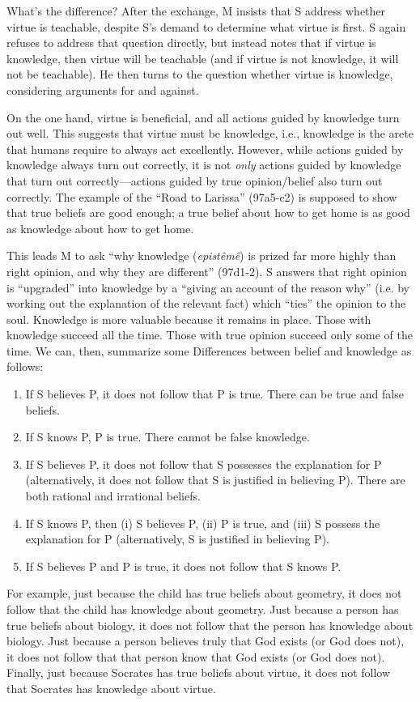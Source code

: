 \documentclass[10 pt]{article}
\begin{document}
What's the difference? After the exchange, M insists that S address whether virtue is teachable, despite S's demand to determine what virtue is first. S again refuses to address that question directly, but instead notes that if virtue is knowledge, then virtue will be teachable (and if virtue is not knowledge, it will not be teachable). He then turns to the question whether virtue is knowledge, considering arguments for and against. 

On the one hand, virtue is beneficial, and all actions guided by knowledge turn out well. This suggests that virtue must be knowledge, i.e., knowledge is the arete that humans require to always act excellently. However, while actions guided by knowledge always turn out correctly, it is not \emph{only} actions guided by knowledge that turn out correctly---actions guided by true opinion/belief also turn out correctly.  The example of the ``Road to Larissa'' (97a5-c2) is supposed to show that true beliefs are good enough; a true belief about how to get home is as good as knowledge about how to get home.

This leads M to ask ``why knowledge (\emph{epist\^{e}m\^{e}}) is prized far more highly than right opinion, and why they are different'' (97d1-2). S answers that right opinion is ``upgraded'' into knowledge by a ``giving an account of the reason why'' (i.e. by working out the explanation of the relevant fact) which ``ties'' the opinion to the soul. Knowledge is more valuable because it remains in place. Those with knowledge succeed all the time. Those with true opinion succeed only some of the time. We can, then, summarize some Differences between belief and knowledge as follows:

\begin{enumerate}
\item If S believes P, it does not follow that P is true. There can be true and false beliefs. 
\item If S knows P, P is true. There cannot be false knowledge.
\item If S believes P, it does not follow that S possesses the explanation for P (alternatively, it does not follow that S is justified in believing P). There are both rational and irrational beliefs.
\item If S knows P, then (i) S believes P, (ii) P is true, and (iii) S possess the explanation for P (alternatively, S is justified in believing P). 
\item If S believes P and P is true, it does not follow that S knows P.  
\end{enumerate}

For example, just because the child has true beliefs about geometry, it does not follow that the child has knowledge about geometry. Just because a person has true beliefs about biology, it does not follow that the person has knowledge about biology. Just because a person believes truly that God exists (or God does not), it does not follow that that person know that God exists (or God does not). Finally, just because Socrates has true beliefs about virtue, it does not follow that Socrates has knowledge about virtue. 

 
\end{document}
